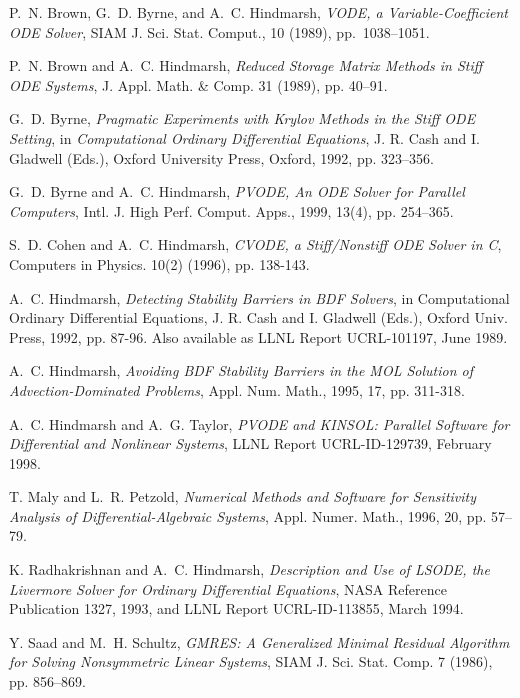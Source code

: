 
\begin{thebibliography}{99}

{P.~N. Brown, G.~D. Byrne, and A.~C. Hindmarsh}, {\em {VODE}, a
Variable-Coefficient {ODE} Solver}, SIAM J. Sci. Stat. Comput., 10 (1989),
pp.~1038--1051.

P.~N. Brown and A.~C. Hindmarsh, {\em Reduced Storage Matrix Methods
in Stiff ODE Systems}, J. Appl. Math. \& Comp. 31 (1989), pp. 40--91.

G.~D. Byrne, {\em Pragmatic Experiments with Krylov Methods in
the Stiff ODE Setting}, in {\em Computational Ordinary Differential
Equations}, J. R. Cash and I. Gladwell (Eds.), Oxford University
Press, Oxford, 1992, pp. 323--356.


G.~D. Byrne and A.~C. Hindmarsh, {\em PVODE, An ODE Solver for Parallel Computers}, 
Intl. J. High Perf. Comput. Apps., 1999, 13(4), pp. 254--365.

S.~D. Cohen and A.~C. Hindmarsh, {\em CVODE, a Stiff/Nonstiff ODE Solver in C},
Computers in Physics. 10(2) (1996), pp. 138-143.

A.~C. Hindmarsh, {\em Detecting Stability Barriers in BDF Solvers},
in Computational Ordinary Differential Equations, J. R. Cash and
I. Gladwell (Eds.), Oxford Univ. Press, 1992, pp. 87-96.  Also
available as LLNL Report UCRL-101197, June 1989.

A.~C. Hindmarsh, {\em Avoiding BDF Stability Barriers in the MOL
Solution of Advection-Dominated Problems},
Appl. Num. Math., 1995, 17, pp. 311-318.

A.~C. Hindmarsh and A.~G. Taylor, {\em PVODE and KINSOL: Parallel Software
for Differential and Nonlinear Systems}, LLNL Report UCRL-ID-129739, February 1998.

T. Maly and L.~R. Petzold, {\em Numerical Methods and Software for Sensitivity
Analysis of Differential-Algebraic Systems}, Appl. Numer. Math., 1996, 20, pp. 57--79.

K. Radhakrishnan and A.~C. Hindmarsh, {\em Description and Use
of LSODE, the Livermore Solver for Ordinary Differential Equations},
NASA Reference Publication 1327, 1993, and LLNL Report UCRL-ID-113855, March
1994.

Y. Saad and M.~H. Schultz, {\em GMRES: A Generalized Minimal Residual
Algorithm for Solving Nonsymmetric Linear Systems}, SIAM J. Sci. Stat.
Comp. 7 (1986), pp. 856--869.

\end{thebibliography}
